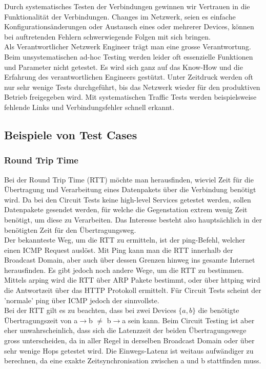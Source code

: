\documentclass[a4,12pt]{scrartcl}
\begin{document}
\noindent Durch systematisches Testen der Verbindungen gewinnen wir Vertrauen in die Funktionalität der Verbindungen. Changes im Netzwerk, seien es einfache Konfigurationsänderungen oder Austausch eines oder mehrerer Devices, können bei auftretenden Fehlern schwerwiegende Folgen mit sich bringen.\\

\noindent Als Verantwortlicher Netzwerk Engineer trägt man eine grosse Verantwortung. Beim unsystematischen ad-hoc Testing werden leider oft essenzielle Funktionen und Parameter nicht getestet. Es wird sich ganz auf das Know-How und die Erfahrung des verantwortlichen Engineers gestützt. Unter Zeitdruck werden oft nur sehr wenige Tests durchgeführt, bis das Netzwerk wieder für den produktiven Betrieb freigegeben wird. Mit systematischen Traffic Tests werden beispielsweise fehlende Links und Verbindungsfehler schnell erkannt. 
\subsection{Beispiele von Test Cases}
\subsubsection{Round Trip Time}
Bei der Round Trip Time (RTT) möchte man herausfinden, wieviel Zeit für die Übertragung und Verarbeitung eines Datenpakets über die Verbindung benötigt wird. Da bei den Circuit Tests keine high-level Services getestet werden, sollen Datenpakete gesendet werden, für welche die Gegenstation extrem wenig Zeit benötigt, um diese zu Verarbeiten. Das Interesse besteht also hauptsächlich in der benötigten Zeit für den Übertragungsweg.\\

\noindent Der bekannteste Weg, um die RTT zu ermitteln, ist der ping-Befehl, welcher einen ICMP Request auslöst. Mit Ping kann man die RTT innerhalb der Broadcast Domain, aber auch über dessen Grenzen hinweg ins gesamte Internet herausfinden. Es gibt jedoch noch andere Wege, um die RTT zu bestimmen. Mittels arping wird die RTT über ARP Pakete bestimmt, oder über httping wird die Antwortzeit über das HTTP Protokoll ermittelt. Für Circuit Tests scheint der 'normale' ping über ICMP jedoch der sinnvollste.\\

\noindent Bei der RTT gilt es zu beachten, dass bei zwei Devices $\{a,b\}$ die benötigte Übertragungszeit von a$\rightarrow$b $\neq$ b$\rightarrow$a sein kann. Beim Circuit Testing ist aber eher unwahrscheinlich, dass sich die Latenzzeit der beiden Übertragungswege gross unterscheiden, da in aller Regel in derselben Broadcast Domain oder über sehr wenige Hops getestet wird. Die Einwegs-Latenz ist weitaus aufwändiger zu berechnen, da eine exakte Zeitsynchronisation zwischen a und b stattfinden muss.\\
\end{document}
